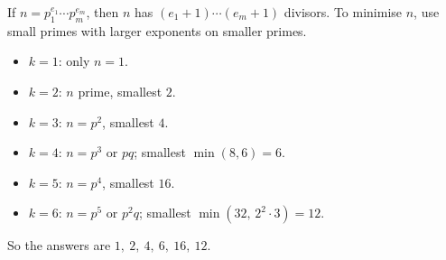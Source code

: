 If $n=p_1^{e_1}\cdots p_m^{e_m}$, then $n$ has $(e_1+1)\cdots(e_m+1)$ divisors. To minimise $n$, use small primes with larger exponents on smaller primes.
\begin{itemize}
\item $k=1$: only $n=1$.
\item $k=2$: $n$ prime, smallest $2$.
\item $k=3$: $n=p^2$, smallest $4$.
\item $k=4$: $n=p^3$ or $pq$; smallest $\min(8,6)=6$.
\item $k=5$: $n=p^4$, smallest $16$.
\item $k=6$: $n=p^5$ or $p^2q$; smallest $\min(32,\,2^2\cdot3)=12$.
\end{itemize}
So the answers are $\boxed{1,\ 2,\ 4,\ 6,\ 16,\ 12}$.
